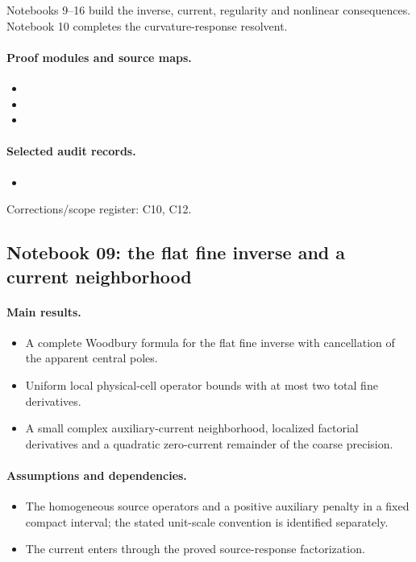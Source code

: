 \documentclass[11pt]{article}
\theoremstyle{remark}
\begin{document}
Notebooks 9--16 build the inverse, current, regularity and nonlinear consequences. Notebook 10 completes the curvature-response resolvent.

\paragraph{Proof modules and source maps.}
\begingroup\small
\begin{itemize}
\item {}
\item {}
\item {}
\end{itemize}
\endgroup

\paragraph{Selected audit records.}
\begingroup\small
\begin{itemize}
\item {}
\end{itemize}
\endgroup
Corrections/scope register: C10, C12.\par

\subsection{Notebook 09: the flat fine inverse and a current neighborhood}
\label{hnc-09}
\noindent{}\par

\paragraph{Main results.}
\begin{itemize}
\item A complete Woodbury formula for the flat fine inverse with cancellation of the apparent central poles.
\item Uniform local physical-cell operator bounds with at most two total fine derivatives.
\item A small complex auxiliary-current neighborhood, localized factorial derivatives and a quadratic zero-current remainder of the coarse precision.
\end{itemize}

\paragraph{Assumptions and dependencies.}
\begin{itemize}
\item The homogeneous source operators and a positive auxiliary penalty in a fixed compact interval; the stated unit-scale convention is identified separately.
\item The current enters through the proved source-response factorization.
\end{itemize}
\end{document}

